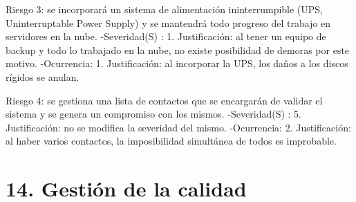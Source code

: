 \documentclass[
11pt, %
]{charter}
\begin{document}
Riesgo 3: se incorporará un sistema de alimentación ininterrumpible (UPS,  Uninterruptable Power Supply) y se mantendrá todo progreso del trabajo en servidores en la nube. 
\newline
-Severidad(S) : 1.\newline
Justificación: al tener un equipo de backup y todo lo trabajado en la nube, no existe posibilidad de demoras por este motivo.\newline
-Ocurrencia: 1.\newline
Justificación: al incorporar la UPS, los daños a los discos rígidos se anulan.\newline
 
Riesgo 4: se gestiona una lista de contactos que se encargarán de validar el sistema y se genera un compromiso con los mismos.
\newline
-Severidad(S) : 5.\newline
Justificación: no se modifica la severidad del mismo.
\newline
-Ocurrencia: 2.\newline
Justificación: al haber varios contactos, la imposibilidad simultánea de todos es improbable.\newline

\section{14. Gestión de la calidad}
\label{sec:calidad}
\end{document}
